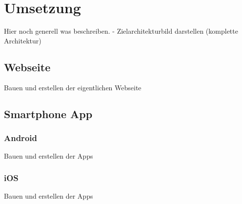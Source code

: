 \section{Umsetzung}
Hier noch generell was beschreiben. - Zielarchitekturbild darstellen (komplette Architektur)

\subsection{Webseite}
Bauen und erstellen der eigentlichen Webseite

\subsection{Smartphone App}

\subsubsection{Android}
Bauen und erstellen der Apps

\subsubsection{iOS}
Bauen und erstellen der Apps